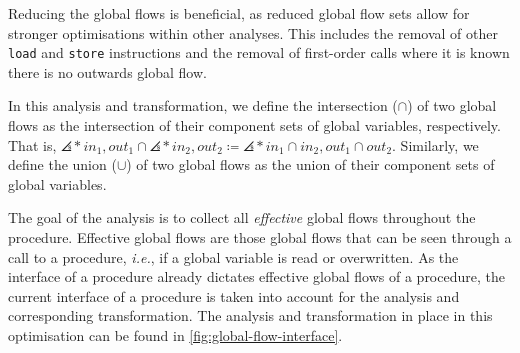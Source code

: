 Reducing the global flows is beneficial, as reduced global flow sets allow for stronger optimisations within other analyses. This includes the removal of other \texttt{load} and \texttt{store} instructions and the removal of first-order calls where it is known there is no outwards global flow.

In this analysis and transformation, we define the intersection ($\cap$) of two global flows as the intersection of their component sets of global variables, respectively. That is, $\angles*{in_1, out_1}\cap \angles*{in_2, out_2} \coloneqq \angles*{in_1 \cap in_2, out_1 \cap out_2}$. Similarly, we define the union ($\cup$) of two global flows as the union of their component sets of global variables. 

The goal of the analysis is to collect all \textit{effective} global flows throughout the procedure. Effective global flows are those global flows that can be seen through a call to a procedure, \textit{i.e.}, if a global variable is read or overwritten. As the interface of a procedure already dictates effective global flows of a procedure, the current interface of a procedure is taken into account for the analysis and corresponding transformation. The analysis and transformation in place in this optimisation can be found in \cref{fig:global-flow-interface}.

